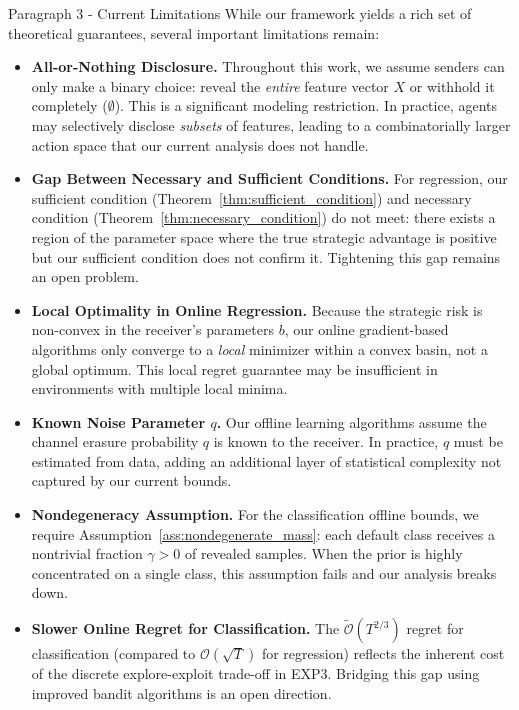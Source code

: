 \begin{sourceblock}{Paragraph 3 - Current Limitations}
While our framework yields a rich set of theoretical guarantees, several important limitations remain:

\begin{itemize}
    \item \textbf{All-or-Nothing Disclosure.} Throughout this work, we assume senders can only make a binary choice: reveal the \emph{entire} feature vector $X$ or withhold it completely ($\emptyset$). This is a significant modeling restriction. In practice, agents may selectively disclose \emph{subsets} of features, leading to a combinatorially larger action space that our current analysis does not handle.
    
    \item \textbf{Gap Between Necessary and Sufficient Conditions.} For regression, our sufficient condition (Theorem~\ref{thm:sufficient_condition}) and necessary condition (Theorem~\ref{thm:necessary_condition}) do not meet: there exists a region of the parameter space where the true strategic advantage is positive but our sufficient condition does not confirm it. Tightening this gap remains an open problem.
    
    \item \textbf{Local Optimality in Online Regression.} Because the strategic risk is non-convex in the receiver's parameters $b$, our online gradient-based algorithms only converge to a \emph{local} minimizer within a convex basin, not a global optimum. This local regret guarantee may be insufficient in environments with multiple local minima.
    
    \item \textbf{Known Noise Parameter $q$.} Our offline learning algorithms assume the channel erasure probability $q$ is known to the receiver. In practice, $q$ must be estimated from data, adding an additional layer of statistical complexity not captured by our current bounds.
    
    \item \textbf{Nondegeneracy Assumption.} For the classification offline bounds, we require Assumption~\ref{ass:nondegenerate_mass}: each default class receives a nontrivial fraction $\gamma > 0$ of revealed samples. When the prior is highly concentrated on a single class, this assumption fails and our analysis breaks down.
    
    \item \textbf{Slower Online Regret for Classification.} The $\tilde{\mathcal{O}}(T^{2/3})$ regret for classification (compared to $\mathcal{O}(\sqrt{T})$ for regression) reflects the inherent cost of the discrete explore-exploit trade-off in EXP3. Bridging this gap using improved bandit algorithms is an open direction.
\end{itemize}
\end{sourceblock}

